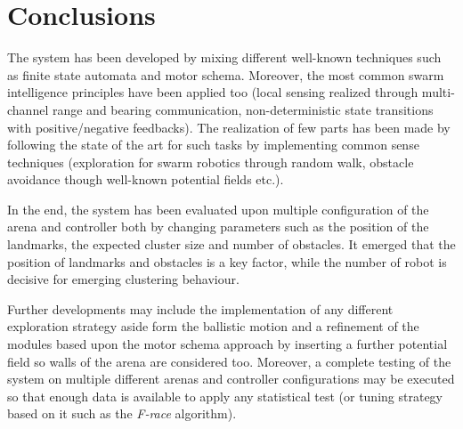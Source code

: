 \chapter{Conclusions}

The system has been developed by mixing different well-known techniques such as finite state automata and motor schema. Moreover, the most common swarm intelligence principles have been applied too (local sensing realized through multi-channel range and bearing communication, non-deterministic state transitions with positive/negative feedbacks). The realization of few parts has been made by following the state of the art for such tasks by implementing common sense techniques (exploration for swarm robotics through random walk, obstacle avoidance though  well-known potential fields etc.). 

\noindent
In the end, the system has been evaluated upon multiple configuration of the arena and controller both by changing parameters such as the position of the landmarks, the expected cluster size and number of obstacles. It emerged that the position of landmarks and obstacles is a key factor, while the number of robot is decisive for emerging clustering behaviour.

\bigskip
Further developments may include the implementation of any different exploration strategy aside form the ballistic motion and a refinement of the modules based upon the motor schema approach by inserting a further potential field so walls of the arena are considered too. Moreover, a complete testing of the system on multiple different arenas and controller configurations may be executed so that enough data is available to apply any statistical test (or tuning strategy based on it such as the \textit{F-race} algorithm).      